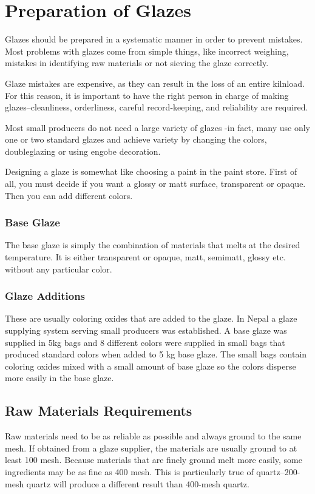 \chapter{Preparation of Glazes}
Glazes should be prepared in a systematic manner in order to prevent mistakes. 
Most problems with glazes come from simple things, like incorrect weighing, 
mistakes in identifying raw materials or not sieving the glaze correctly.

Glaze mistakes are expensive, as they can result in the loss of an entire 
kilnload. For this reason, it is important to have the right person in charge 
of making glazes--cleanliness, orderliness, careful record-keeping, and 
reliability are required.

Most small producers do not need a large variety of glazes -in fact, many use 
only one or two standard glazes and achieve variety by changing the colors, 
doubleglazing or using engobe decoration.

Designing a glaze is somewhat like choosing a paint in the paint store. First 
of all, you must decide if you want a glossy or matt surface, transparent or 
opaque. Then you can add different colors.
\subsection*{Base Glaze}
The base glaze is simply the combination of materials that melts at the desired 
temperature. It is either transparent or opaque, matt, semimatt, glossy etc. 
without any particular color.
\subsection*{Glaze Additions}
These are usually coloring oxides that are added to the glaze. In Nepal a glaze 
supplying system serving small producers was established. A base glaze was 
supplied in 5kg bags and 8 different colors were supplied in small bags that 
produced standard colors when added to 5 kg base glaze. The small bags contain 
coloring oxides mixed with a small amount of base glaze so the colors disperse 
more easily in the base glaze.
\section{Raw Materials Requirements}
Raw materials need to be as reliable as possible and always ground to the same 
mesh. If obtained from a glaze supplier, the materials are usually ground to at 
least 100 mesh. Because materials that are finely ground melt more easily, some 
ingredients may be as fine as 400 mesh. This is particularly true of 
quartz--200-mesh quartz will produce a different result than 400-mesh quartz.

